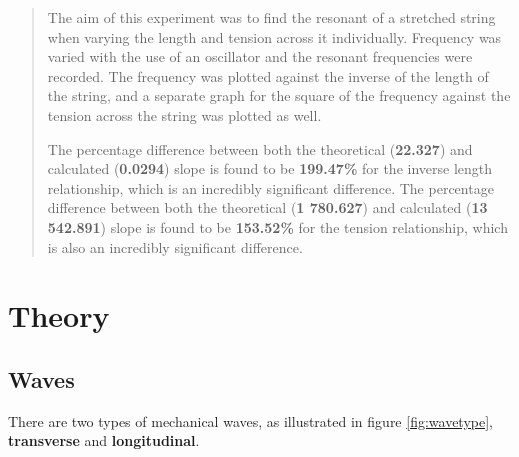 \documentclass[12pt]{article}
\begin{document}
\setcounter{page}{1}
\tableofcontents

\newpage

\begin{abstract}

The aim of this experiment was to find the resonant of a stretched string when varying the length and tension across it individually.
Frequency was varied with the use of an oscillator and the resonant frequencies were recorded. The frequency was plotted against the inverse of the length of the string, and
a separate graph for the square of the frequency against the tension across the string was plotted as well.

The percentage difference between both the theoretical (\textbf{22.327}) and calculated (\textbf{0.0294}) slope is found to be \textbf{199.47\%} for the inverse length relationship, which is an incredibly significant difference.
The percentage difference between both the theoretical (\textbf{1 780.627}) and calculated (\textbf{13 542.891}) slope is found to be \textbf{153.52\%} for the tension relationship, which is also an incredibly significant difference.

\end{abstract}


\vspace{3.5cm}
\section{Theory} \label{sec:1}


\subsection{Waves}

There are two types of mechanical waves, as illustrated in figure \ref{fig:wavetype}, \textbf{transverse} and \textbf{longitudinal}.
\end{document}
